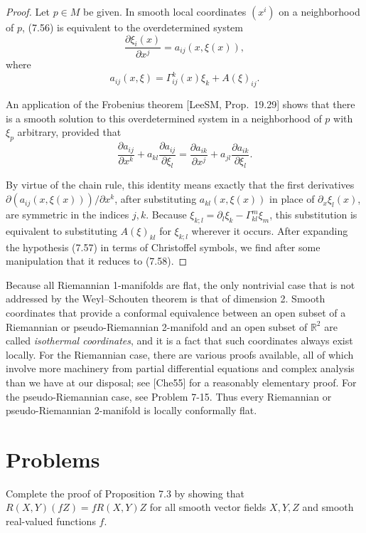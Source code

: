 \begin{proof}
Let $p \in M$ be given. In smooth local coordinates $(x^i)$ on a neighborhood of $p$, (7.56) is equivalent to the overdetermined system
$$\frac{\partial\xi_i(x)}{\partial x^j} = a_{ij}(x, \xi(x)),$$
where
$$a_{ij}(x, \xi) = \Gamma_{ij}^k(x)\xi_k + A(\xi)_{ij}.$$

An application of the Frobenius theorem [LeeSM, Prop.~19.29] shows that there is a smooth solution to this overdetermined system in a neighborhood of $p$ with $\xi_p$ arbitrary, provided that
\begin{equation}
\frac{\partial a_{ij}}{\partial x^k} + a_{kl} \frac{\partial a_{ij}}{\partial \xi_l} = \frac{\partial a_{ik}}{\partial x^j} + a_{jl} \frac{\partial a_{ik}}{\partial \xi_l}. \tag{7.58}
\end{equation}

By virtue of the chain rule, this identity means exactly that the first derivatives $\partial(a_{ij}(x,\xi(x)))/\partial x^k$, after substituting $a_{kl}(x,\xi(x))$ in place of $\partial_x \xi_l(x)$, are symmetric in the indices $j, k$. Because $\xi_{k;l} = \partial_l \xi_k - \Gamma_{kl}^m \xi_m$, this substitution is equivalent to substituting $A(\xi)_{kl}$ for $\xi_{k;l}$ wherever it occurs. After expanding the hypothesis (7.57) in terms of Christoffel symbols, we find after some manipulation that it reduces to (7.58).
\end{proof}

Because all Riemannian 1-manifolds are flat, the only nontrivial case that is not addressed by the Weyl--Schouten theorem is that of dimension 2. Smooth coordinates that provide a conformal equivalence between an open subset of a Riemannian or pseudo-Riemannian 2-manifold and an open subset of $\mathbb{R}^2$ are called \textit{isothermal coordinates}, and it is a fact that such coordinates always exist locally. For the Riemannian case, there are various proofs available, all of which involve more machinery from partial differential equations and complex analysis than we have at our disposal; see [Che55] for a reasonably elementary proof. For the pseudo-Riemannian case, see Problem 7-15. Thus every Riemannian or pseudo-Riemannian 2-manifold is locally conformally flat.

\section{Problems}

\begin{exercise}
\label{prob:curvature-multilinearity-in-functions}
Complete the proof of Proposition 7.3 by showing that $R(X,Y)(fZ) = fR(X,Y)Z$ for all smooth vector fields $X,Y,Z$ and smooth real-valued functions $f$.
\end{exercise}

